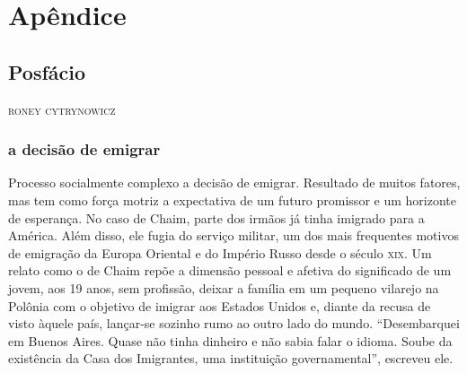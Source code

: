 \part{Apêndice}

\chapter*{Posfácio\smallskip{}}

\begin{flushright}
\textsc{roney cytrynowicz}
\end{flushright}

\noindent{}


\section{a decisão de emigrar}

Processo socialmente complexo a decisão de emigrar. Resultado de muitos fatores, mas tem 
como força motriz a expectativa de um futuro promissor e um horizonte de
esperança. No caso de Chaim, parte dos irmãos já tinha imigrado para a
América. Além disso, ele fugia do serviço militar, um dos mais frequentes
motivos de emigração da Europa Oriental e do Império Russo desde o
século \textsc{xix}. Um relato como o de Chaim repõe a dimensão pessoal e afetiva do
significado de um jovem, aos 19 anos, sem profissão, deixar a família em
um pequeno vilarejo na Polônia com o objetivo de imigrar aos Estados
Unidos e, diante da recusa de visto àquele país, lançar-se sozinho rumo
ao outro lado do mundo. ``Desembarquei em Buenos Aires. Quase não tinha dinheiro e não sabia falar
o idioma. Soube da existência da Casa dos Imigrantes, uma instituição governamental'', escreveu ele.

